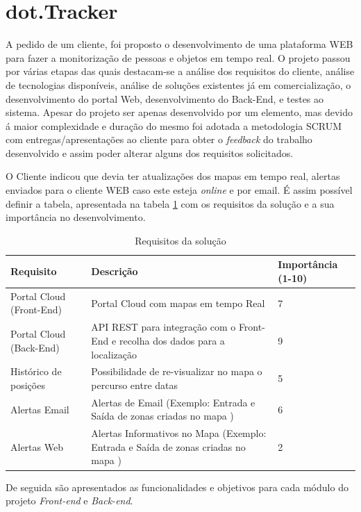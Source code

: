 \section {dot.Tracker}
\par
A pedido de um cliente, foi proposto o desenvolvimento de uma plataforma WEB para fazer a monitorização de pessoas e objetos em tempo real. O projeto passou por várias etapas das quais destacam-se a análise dos requisitos do cliente, análise de tecnologias disponíveis, análise de soluções existentes já em comercialização, o desenvolvimento do portal Web, desenvolvimento do Back-End, e testes ao sistema. Apesar do projeto ser apenas desenvolvido por um elemento, mas devido á maior complexidade e duração do mesmo foi adotada a metodologia SCRUM com entregas/apresentações ao cliente para obter o \textit{feedback} do trabalho desenvolvido e assim poder alterar alguns dos requisitos solicitados.
\par O Cliente indicou que devia ter atualizações dos mapas em tempo real, alertas enviados para o cliente WEB caso este esteja \textit{online} e por email.
É assim possível definir a tabela, apresentada na tabela \ref{tab1} com os requisitos da solução e a sua importância no desenvolvimento.

\begin{table}[htb]
\centering
\caption{Requisitos da solução}\label{tab1}
\begin{tabular}{|p{3cm}|p{8cm}|p{2cm}|}\hline
Requisito&Descrição&Importância (1-10)\\\hline

Portal Cloud (Front-End)&Portal Cloud com mapas em tempo Real& 7\\\hline
Portal Cloud (Back-End) & API REST para integração com o Front-End e recolha dos dados para a localização &9\\\hline
Histórico de posições&Possibilidade de re-visualizar no mapa o percurso entre datas&5\\\hline
Alertas Email&Alertas de Email (Exemplo: Entrada e Saída de zonas criadas no mapa )&6\\\hline
Alertas Web&Alertas Informativos no Mapa (Exemplo: Entrada e Saída de zonas criadas no mapa )&2\\\hline
\end{tabular} 
\end{table}

\par
De seguida são apresentados as funcionalidades e objetivos para cada módulo do projeto \textit{Front-end} e \textit {Back-end}.

